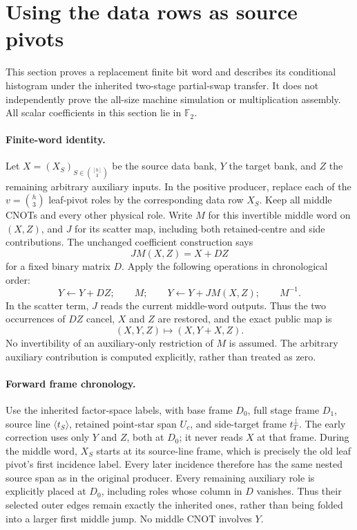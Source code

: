 \section{Using the data rows as source pivots}
\label{sec:borrowed-source-pivots}

This section proves a replacement finite bit word and describes its conditional
histogram under the inherited two-stage partial-swap transfer. It does not
independently prove the all-size machine simulation or multiplication assembly.
All scalar coefficients in this section lie in $\mathbb F_2$.

\paragraph{Finite-word identity.}
Let $X=(X_S)_{S\in\binom{[h]}3}$ be the source data bank, $Y$ the target bank,
and $Z$ the remaining arbitrary auxiliary inputs. In the positive producer,
replace each of the $v=\binom h3$ leaf-pivot roles by the corresponding data row
$X_S$. Keep all middle CNOTs and every other physical role. Write $M$ for this
invertible middle word on $(X,Z)$, and $J$ for its scatter map, including both
retained-centre and side contributions. The unchanged coefficient construction
says
\[
 JM(X,Z)=X+DZ
\]
for a fixed binary matrix $D$. Apply the following operations in chronological
order:
\[
 Y\gets Y+DZ;\qquad M;\qquad Y\gets Y+JM(X,Z);\qquad M^{-1}.
\]
In the scatter term, $J$ reads the current middle-word outputs. Thus the two
occurrences of $DZ$ cancel, $X$ and $Z$ are restored, and the exact public map is
\[
 (X,Y,Z)\longmapsto(X,Y+X,Z).
\]
No invertibility of an auxiliary-only restriction of $M$ is assumed. The
arbitrary auxiliary contribution is computed explicitly, rather than treated
as zero.

\paragraph{Forward frame chronology.}
Use the inherited factor-space labels, with base frame $D_0$, full stage frame
$D_1$, source line $\langle t_S\rangle$, retained point-star span $U_c$, and
side-target frame $t_T^\perp$. The early correction uses only $Y$ and $Z$, both
at $D_0$; it never reads $X$ at that frame. During the middle word, $X_S$ starts
at its source-line frame, which is precisely the old leaf pivot's first
incidence label. Every later incidence therefore has the same nested source
span as in the original producer. Every remaining auxiliary role is explicitly placed at
$D_0$, including roles whose column in $D$ vanishes. Thus their selected
outer edges remain exactly the inherited ones, rather than being folded into
a larger first middle jump. No middle CNOT involves $Y$.

